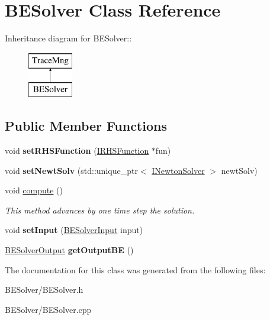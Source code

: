\hypertarget{classBESolver}{
\section{BESolver Class Reference}
\label{classBESolver}
}
Inheritance diagram for BESolver::\begin{figure}[H]
\begin{center}
\leavevmode
\includegraphics[height=2cm]{classBESolver}
\end{center}
\end{figure}
\subsection*{Public Member Functions}
\begin{DoxyCompactItemize}
\item 
\hypertarget{classBESolver_a75cdcd48861507ea3edd7ebbedf9770c}{
void {\bfseries setRHSFunction} (\hyperlink{classIRHSFunction}{IRHSFunction} $\ast$fun)}
\label{classBESolver_a75cdcd48861507ea3edd7ebbedf9770c}

\item 
\hypertarget{classBESolver_aaf3933d2b810cd9d1da51f9aa9f6e3e3}{
void {\bfseries setNewtSolv} (std::unique\_\-ptr$<$ \hyperlink{classINewtonSolver}{INewtonSolver} $>$ newtSolv)}
\label{classBESolver_aaf3933d2b810cd9d1da51f9aa9f6e3e3}

\item 
\hypertarget{classBESolver_abd9f73ecfe190b8007aed57aeec611ca}{
void \hyperlink{classBESolver_abd9f73ecfe190b8007aed57aeec611ca}{compute} ()}
\label{classBESolver_abd9f73ecfe190b8007aed57aeec611ca}

\begin{DoxyCompactList}\small\item\em This method advances by one time step the solution. \item\end{DoxyCompactList}\item 
\hypertarget{classBESolver_aac67d1152ce69e297e70f520619420b2}{
void {\bfseries setInput} (\hyperlink{classBESolverInput}{BESolverInput} input)}
\label{classBESolver_aac67d1152ce69e297e70f520619420b2}

\item 
\hypertarget{classBESolver_a127b8c23946822caf9ce4e46bce779ab}{
\hyperlink{classBESolverOutput}{BESolverOutput} {\bfseries getOutputBE} ()}
\label{classBESolver_a127b8c23946822caf9ce4e46bce779ab}

\end{DoxyCompactItemize}


The documentation for this class was generated from the following files:\begin{DoxyCompactItemize}
\item 
BESolver/BESolver.h\item 
BESolver/BESolver.cpp\end{DoxyCompactItemize}
